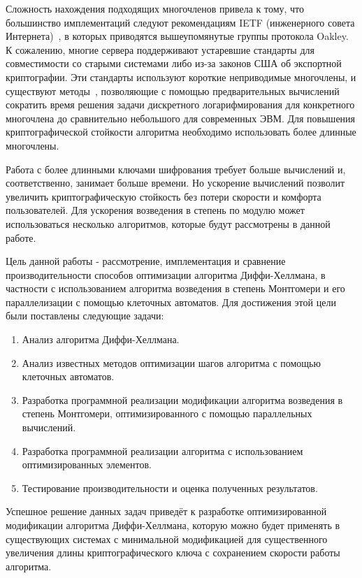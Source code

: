 \documentclass[times,specification,annotation]{itmo-student-thesis}
\begin{document}
Сложность нахождения подходящих многочленов привела к тому, что большинство имплементаций следуют рекомендациям
IETF (инженерного совета Интернета)~\cite{rfc7296}, в которых приводятся вышеупомянутые группы протокола Oakley.
К сожалению, многие сервера поддерживают устаревшие стандарты для совместимости со старыми системами либо
из-за законов США об экспортной криптографии.
Эти стандарты используют короткие неприводимые многочлены, и существуют методы~\cite{adr15},
позволяющие с помощью предварительных вычислений сократить время решения задачи дискретного логарифмирования для
конкретного многочлена до сравнительно небольшого для современных ЭВМ.
Для повышения криптографической стойкости алгоритма необходимо использовать более длинные многочлены.\par
Работа с более длинными ключами шифрования требует больше вычислений и, соответственно, занимает больше времени.
Но ускорение вычислений позволит увеличить криптографическую стойкость без потери скорости и комфорта пользователей.
Для ускорения возведения в степень по модулю может использоваться несколько алгоритмов, которые будут рассмотрены в
данной работе.\par
Цель данной работы - рассмотрение, имплементация и сравнение производительности способов оптимизации алгоритма
Диффи-Хеллмана, в частности с использованием алгоритма возведения в степень Монтгомери и его параллелизации
с помощью клеточных автоматов.
Для достижения этой цели были поставлены следующие задачи:
\begin{enumerate}[label=\arabic*.]
    \item Анализ алгоритма Диффи-Хеллмана.
    \item Анализ известных методов оптимизации шагов алгоритма с помощью клеточных автоматов.
    \item Разработка программной реализации модификации алгоритма возведения в степень Монтгомери, оптимизированного с помощью параллельных вычислений.
    \item Разработка программной реализации алгоритма с использованием оптимизированных элементов.
    \item Тестирование производительности и оценка полученных результатов.
\end{enumerate}
Успешное решение данных задач приведёт к разработке оптимизированной модификации алгоритма Диффи-Хеллмана,
которую можно будет применять в существующих системах с минимальной модификацией для существенного увеличения длины
криптографического ключа с сохранением скорости работы алгоритма.\par
\end{document}
